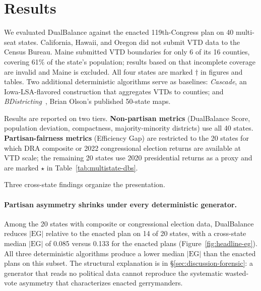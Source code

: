 ﻿\section{Results}
\label{sec:results}

We evaluated DualBalance against the enacted 119th-Congress plan on 40
multi-seat states. California, Hawaii, and Oregon did not submit VTD
data to the Census Bureau. Maine submitted VTD boundaries for only 6 of
its 16 counties, covering 61\% of the state's population; results based
on that incomplete coverage are invalid and Maine is excluded. All four
states are marked $\dagger$ in figures and tables. Two additional
deterministic algorithms serve as baselines:
\emph{Cascade}, an Iowa-LSA-flavored construction that aggregates
VTDs to counties; and \emph{BDistricting}~\cite{olsonbd}, Brian
Olson's published 50-state maps.

Results are reported on two tiers. \textbf{Non-partisan metrics}
(DualBalance Score, population deviation, compactness, majority-minority
districts) use all 40 states. \textbf{Partisan-fairness metrics}
(Efficiency Gap) are restricted to the 20 states for which
DRA composite or 2022 congressional election returns are available at VTD
scale; the remaining 20 states use 2020 presidential returns as a proxy
and are marked $\star$ in Table~\ref{tab:multistate-dbs}.

Three cross-state findings organize the presentation.

\paragraph{Partisan asymmetry shrinks under every deterministic generator.}
Among the 20 states with composite or congressional election data, DualBalance
reduces $|\mathrm{EG}|$ relative to the enacted plan on 14 of 20 states,
with a cross-state median $|\mathrm{EG}|$ of 0.085 versus 0.133 for the
enacted plans (Figure~\ref{fig:headline-eg}). All three deterministic
algorithms produce a lower median $|\mathrm{EG}|$ than the enacted plans on
this subset. The structural explanation is in \S\ref{sec:discussion-forensic}:
a generator that reads no political data cannot reproduce the systematic
wasted-vote asymmetry that characterizes enacted gerrymanders.


